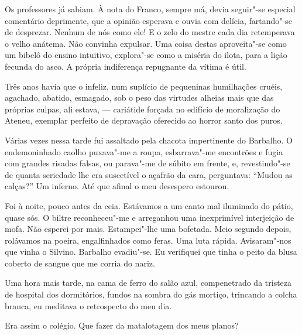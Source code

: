 Os professores já sabiam. À nota do Franco, sempre má, devia seguir"-se 
especial comentário deprimente, que a opinião esperava e ouvia com delícia,
fartando"-se de desprezar. Nenhum de nós como ele! E o zelo do mestre
cada dia retemperava o velho anátema. Não convinha expulsar. Uma coisa
destas aproveita"-se como um bibelô do ensino intuitivo, explora"-se
como a miséria do ilota, para a lição fecunda do asco. A própria
indiferença repugnante da vítima é útil. 

Três anos havia que o infeliz,
num suplício de pequeninas humilhações cruéis, agachado, abatido,
esmagado, sob o peso das virtudes alheias mais que das próprias culpas,
ali estava, --- cariátide forçada no edifício de moralização do Ateneu,
exemplar perfeito de depravação oferecido ao horror santo dos puros.

Várias vezes nessa tarde fui assaltado pela chacota impertinente do
Barbalho. O endemoninhado caolho puxava"-me a roupa, esbarrava"-me
encontrões e fugia com grandes risadas falsas, ou parava"-me de súbito em
frente, e, revestindo"-se de quanta seriedade lhe era suscetível o
açafrão da cara, perguntava: ``Mudou as calças?'' Um inferno. Até que
afinal o meu desespero estourou. 

Foi à noite, pouco antes da ceia.
Estávamos a um canto mal iluminado do pátio, quase sós. O biltre
reconheceu"-me e arreganhou uma inexprimível interjeição de mofa. Não
esperei por mais. Estampei"-lhe uma bofetada. Meio segundo depois,
rolávamos na poeira, engalfinhados como feras. Uma luta rápida.
Avisaram"-nos que vinha o Silvino. Barbalho evadiu"-se. Eu verifiquei
que tinha o peito da blusa coberto de sangue que me corria do nariz. 

Uma hora mais tarde, na cama de ferro do salão azul, compenetrado da tristeza de 
hospital dos dormitórios, fundos na sombra do gás mortiço, trincando a colcha
branca, eu meditava o retrospecto do meu dia. 

Era assim o colégio. Que fazer da matalotagem dos meus planos? 


